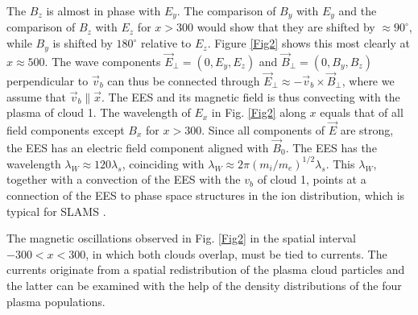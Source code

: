 \documentclass[structabstract]{aa}
\begin{document}
The $B_z$ is almost in phase with $E_y$. The comparison of $B_y$ with $E_y$ 
and the comparison of $B_z$ with $E_z$ for $x> 300$ would show that they 
are shifted by $\approx 90^\circ$, while $B_y$ is shifted by $180^\circ$ 
relative to $E_z$. Figure \ref{Fig2} shows this most clearly at $x\approx 
500$. The wave components $\vec{E}_{\perp} = (0,E_y,E_z)$ and $\vec{B}_{\perp} 
= (0,B_y,B_z)$ perpendicular to $\vec{v}_b$ can thus be connected through 
$\vec{E}_{\perp} \approx -\vec{v}_b \times \vec{B}_{\perp}$, where we assume
that $\vec{v}_b \parallel \vec{x}$. The EES and its magnetic field is thus 
convecting with the plasma of cloud 1. The wavelength of $E_x$ in Fig. 
\ref{Fig2} along $x$ equals that of all field components except $B_x$ for 
$x>300$. Since all components of $\vec{E}$ are strong, the EES has an 
electric field component aligned with $\vec{B}_0$. The EES has the wavelength 
$\lambda_W \approx 120 \lambda_s$, coinciding with $\lambda_W \approx 2\pi 
{(m_i / m_e)}^{1/2} \lambda_s$. This $\lambda_W$, together with a convection 
of the EES with the $v_b$ of cloud 1, points at a connection of the EES to 
phase space structures in the ion distribution, which is typical for SLAMS 
\citep{SLAMS}.

The magnetic oscillations observed in Fig. \ref{Fig2} in the spatial 
interval $-300 < x < 300$, in which both clouds overlap, must be tied 
to currents. The currents originate from a spatial redistribution of 
the plasma cloud particles and the latter can be examined with the help 
of the density distributions of the four plasma populations. 
\end{document}
